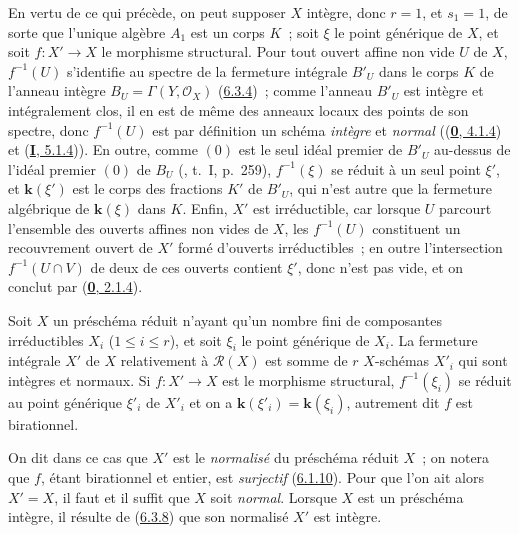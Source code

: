 En vertu de ce qui précède, on peut supposer $X$ intègre, donc $r=1$, et
$s_1=1$, de sorte que l'unique algèbre $A_1$ est un corps $K$~; soit $\xi$ le
point générique de $X$, et soit $f:X'\to X$ le morphisme structural. Pour tout
ouvert affine non vide $U$ de $X$, $f^{-1}(U)$ s'identifie au spectre de la
fermeture intégrale $B'_U$ dans le corps $K$ de l'anneau intègre
$B_U=\Gamma(Y,\mathcal{O}_X)$ (\hyperref[II.6.3.4-fr]{6.3.4})~; comme l'anneau
$B'_U$ est intègre et intégralement clos, il en est de même des anneaux locaux
des points de son spectre, donc $f^{-1}(U)$ est par définition un schéma
\emph{intègre} et \emph{normal} ((\hyperref[0.4.1.4-fr]{\textbf{0}, 4.1.4}) et
(\hyperref[I.5.1.4-fr]{\textbf{I}, 5.1.4})). En outre, comme $(0)$ est le seul idéal
premier de $B'_U$ au-dessus de l'idéal premier $(0)$ de $B_U$
(\cite{I-13}, t.~I, p.~259), $f^{-1}(\xi)$ se réduit à un seul point $\xi'$,
et $\boldsymbol{k}(\xi')$ est le corps des fractions $K'$ de $B'_U$, qui n'est autre que la
fermeture algébrique de $\boldsymbol{k}(\xi)$ dans $K$. Enfin, $X'$ est irréductible, car
lorsque $U$ parcourt l'ensemble des ouverts affines non vides de $X$, les
$f^{-1}(U)$ constituent un recouvrement ouvert de $X'$ formé d'ouverts
irréductibles~; en outre l'intersection $f^{-1}(U\cap V)$ de deux de ces
ouverts contient $\xi'$, donc n'est pas vide, et on conclut par
(\hyperref[0.2.1.4-fr]{\textbf{0}, 2.1.4}).

\begin{corollary}[6.3.8]
\label{II.6.3.8-fr}
Soit $X$ un préschéma réduit n'ayant qu'un nombre fini de composantes
irréductibles $X_i$ ($1\leq i\leq r$), et soit $\xi_i$ le point générique de
$X_i$. La fermeture intégrale $X'$ de $X$ relativement à $\mathcal{R}(X)$ est
somme de $r$ $X$-schémas $X'_i$ qui sont intègres et normaux. Si $f:X'\to X$
est le morphisme structural, $f^{-1}(\xi_i)$ se réduit au point générique
$\xi'_i$ de $X'_i$ et on a $\boldsymbol{k}(\xi'_i)=\boldsymbol{k}(\xi_i)$, autrement dit $f$ est
birationnel.
\end{corollary}

On dit dans ce cas que $X'$ est le \emph{normalisé} du préschéma réduit $X$~;
on notera que $f$, étant birationnel et entier, est \emph{surjectif}
(\hyperref[II.6.1.10-fr]{6.1.10}). Pour que l'on ait alors $X'=X$, il faut et
il suffit que $X$ soit \emph{normal}. Lorsque $X$ est un préschéma intègre, il résulte
de (\hyperref[II.6.3.8-fr]{6.3.8}) que son normalisé $X'$ est intègre.


